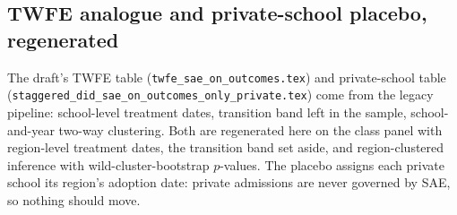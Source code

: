 \documentclass[
]{article}
\begin{document}
\begin{table}[htbp]
   \caption{Class-Weighted and Student-Weighted ATTs}\label{tab: student weighted}
   \centerline{}
\end{table}

\hypertarget{twfe-analogue-and-private-school-placebo-regenerated}{%
\subsection{TWFE analogue and private-school placebo,
regenerated}\label{twfe-analogue-and-private-school-placebo-regenerated}}

The draft's TWFE table (\texttt{twfe\_sae\_on\_outcomes.tex}) and
private-school table
(\texttt{staggered\_did\_sae\_on\_outcomes\_only\_private.tex}) come
from the legacy pipeline: school-level treatment dates, transition band
left in the sample, school-and-year two-way clustering. Both are
regenerated here on the class panel with region-level treatment dates,
the transition band set aside, and region-clustered inference with
wild-cluster-bootstrap \(p\)-values. The placebo assigns each private
school its region's adoption date: private admissions are never governed
by SAE, so nothing should move.
\end{document}
